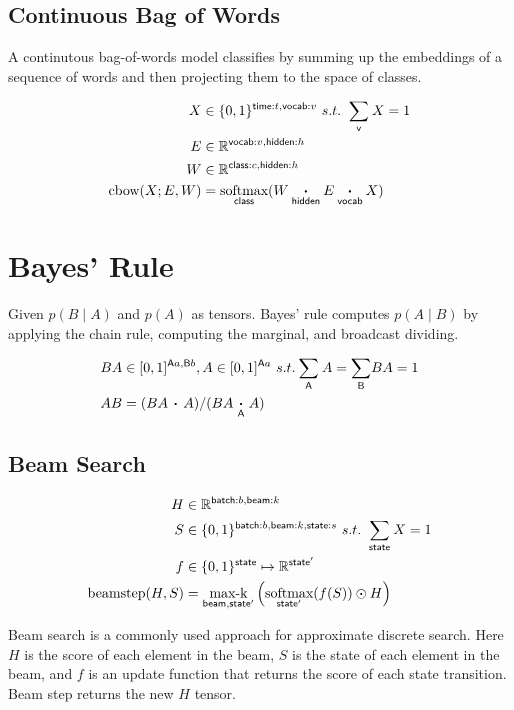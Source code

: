 \documentclass{article}
\newcommand{\reals}[0]{\mathbb{R}}
\newcommand{\nsum}[1]{\mathbin{\mathop{\sum}\displaylimits_{\name{#1}}}}
\newcommand{\nfun}[2]{\underset{\name{#1}}{#2}}
\newcommand{\name}[1]{\mathsf{#1}}
\newcommand{\ndot}[1]{\mathbin{\mathop{\thinspace\boldsymbol\cdot\thinspace}\displaylimits_{\name{#1}}}}
\begin{document}
\subsection*{Continuous Bag of Words}

A continutous bag-of-words model classifies by summing up the embeddings of a sequence of words and then projecting them to the space of classes. 

\begin{align*} 
X &\in \{0, 1\}^{{\name{time}:t, \name{vocab}:v}}\ s.t. \ \nsum{v} X = 1\\
E &\in \reals^{{\name{vocab}:v, \name{hidden}:h}}\\
W &\in \reals^{{\name{class}:c, \name{hidden}:h}}\\
\text{cbow}(X; E, W) &= \nfun{class}{\text{softmax}} (W \ndot{hidden} E \ndot{vocab} X)
\end{align*}

\section*{Bayes' Rule}

Given $p(B \mid A)$ and $p(A)$ as tensors. Bayes' rule computes $p(A \mid B)$ by applying the chain rule, computing the marginal, and broadcast dividing. 

\begin{align*} 
BA &\in [0, 1]^{\name{A}{a}, \name{B}{b}}, 
A \in [0, 1]^{\name{A}{a}} \ s.t. \nsum{A} A =  \nsum{B} BA =  1 \\
AB &= (BA \ndot{} A)  / (BA \ndot{A} A)
\end{align*}


\subsection*{Beam Search}


\begin{align*} 
H &\in \reals^{{ \name{batch}:b, \name{beam}:k}} \\
S &\in \{0, 1\}^{{ \name{batch}:b, \name{beam}:k, \name{state}:s}} \ s.t. \ \nsum{state} X = 1\\
f &\in \{0, 1\}^{{\name{state}}} \mapsto \reals^{{\name{state'}}} \\ 
\text{beamstep}(H, S) &=  \nfun{beam, state'}{\text{max-k}} \left( \nfun{state'}{\text{softmax}}(f(S)) \odot H  \right)
\end{align*} 

Beam search is a commonly used approach for approximate discrete search. Here $H$ is the score of each element in the beam, $S$ is the state of each element in the beam, and $f$ is an update function that returns the score of each state transition. 
Beam step returns the new $H$ tensor. 
\end{document}
